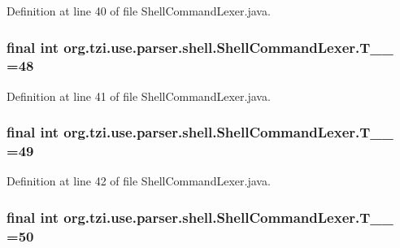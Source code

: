 Definition at line 40 of file Shell\-Command\-Lexer.\-java.

\hypertarget{classorg_1_1tzi_1_1use_1_1parser_1_1shell_1_1_shell_command_lexer_ac425b5ef6782836818611287a1ad0103}{
\subsubsection[{T\-\_\-\-\_\-48}]{\setlength{\rightskip}{0pt plus 5cm}final int org.\-tzi.\-use.\-parser.\-shell.\-Shell\-Command\-Lexer.\-T\-\_\-\-\_ =48\hspace{0.3cm}{\ttfamily [static]}}}\label{classorg_1_1tzi_1_1use_1_1parser_1_1shell_1_1_shell_command_lexer_ac425b5ef6782836818611287a1ad0103}


Definition at line 41 of file Shell\-Command\-Lexer.\-java.

\hypertarget{classorg_1_1tzi_1_1use_1_1parser_1_1shell_1_1_shell_command_lexer_a970703472c82f87806d7ae16db688907}{
\subsubsection[{T\-\_\-\-\_\-49}]{\setlength{\rightskip}{0pt plus 5cm}final int org.\-tzi.\-use.\-parser.\-shell.\-Shell\-Command\-Lexer.\-T\-\_\-\-\_ =49\hspace{0.3cm}{\ttfamily [static]}}}\label{classorg_1_1tzi_1_1use_1_1parser_1_1shell_1_1_shell_command_lexer_a970703472c82f87806d7ae16db688907}


Definition at line 42 of file Shell\-Command\-Lexer.\-java.

\hypertarget{classorg_1_1tzi_1_1use_1_1parser_1_1shell_1_1_shell_command_lexer_ac2734163048651823d34b9b86ca71e01}{
\subsubsection[{T\-\_\-\-\_\-50}]{\setlength{\rightskip}{0pt plus 5cm}final int org.\-tzi.\-use.\-parser.\-shell.\-Shell\-Command\-Lexer.\-T\-\_\-\-\_ =50\hspace{0.3cm}{\ttfamily [static]}}}\label{classorg_1_1tzi_1_1use_1_1parser_1_1shell_1_1_shell_command_lexer_ac2734163048651823d34b9b86ca71e01}


